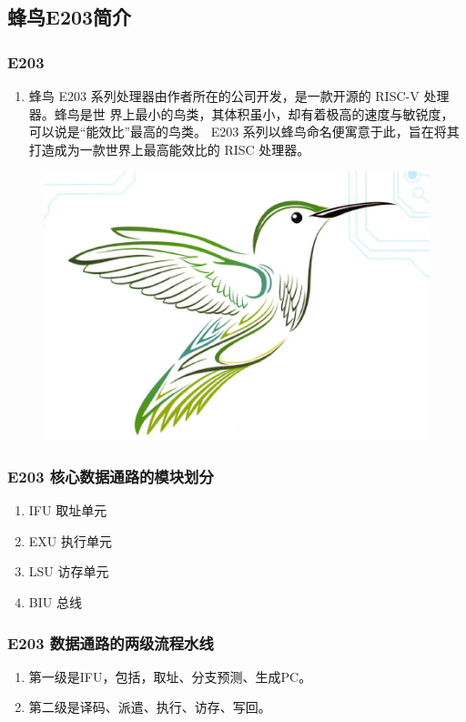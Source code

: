 \documentclass[a4paper, 14pt, oneside]{book} %
\numberwithin{equation}{subsection}
\begin{document}
		\subsection{蜂鸟E203简介}
			\subsubsection{E203}
				\begin{enumerate}
					\item 
						蜂鸟 E203 系列处理器由作者所在的公司开发，是一款开源的 RISC-V 处理器。蜂鸟是世
						界上最小的鸟类，其体积虽小，却有着极高的速度与敏锐度，可以说是“能效比”最高的鸟类。
						E203 系列以蜂鸟命名便寓意于此，旨在将其打造成为一款世界上最高能效比的 RISC 处理器。
				\end{enumerate}	
				\begin{figure}[!htbp]
					\centering
					\includegraphics[scale=0.8]{img/four.png}
				\end{figure}
					
			\subsubsection{E203 核心数据通路的模块划分}
				\begin{enumerate}
					\item 
						IFU 取址单元
					\item 
						EXU 执行单元
					\item 
						LSU 访存单元
					\item 
						BIU 总线
				\end{enumerate}	

			\subsubsection{E203 数据通路的两级流程水线}
				\begin{enumerate}
					\item 
						第一级是IFU，包括，取址、分支预测、生成PC。
					\item 
						第二级是译码、派遣、执行、访存、写回。
				\end{enumerate}	
\end{document}
